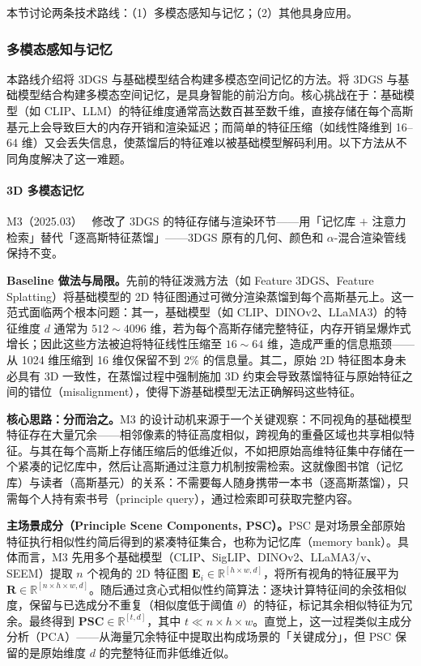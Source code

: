 本节讨论两条技术路线：（1）多模态感知与记忆；（2）其他具身应用。

\subsubsection{多模态感知与记忆}

本路线介绍将 3DGS 与基础模型结合构建多模态空间记忆的方法。将 3DGS 与基础模型结合构建多模态空间记忆，是具身智能的前沿方向。核心挑战在于：基础模型（如 CLIP、LLM）的特征维度通常高达数百甚至数千维，直接存储在每个高斯基元上会导致巨大的内存开销和渲染延迟；而简单的特征压缩（如线性降维到 16--64 维）又会丢失信息，使蒸馏后的特征难以被基础模型解码利用。以下方法从不同角度解决了这一难题。

\paragraph{3D 多模态记忆}

M3（2025.03）~\cite{2503_16413} 修改了 3DGS 的特征存储与渲染环节——用「记忆库 $+$ 注意力检索」替代「逐高斯特征蒸馏」——3DGS 原有的几何、颜色和 $\alpha$-混合渲染管线保持不变。

\textbf{Baseline 做法与局限。}先前的特征泼溅方法（如 Feature 3DGS、Feature Splatting）将基础模型的 2D 特征图通过可微分渲染蒸馏到每个高斯基元上。这一范式面临两个根本问题：其一，基础模型（如 CLIP、DINOv2、LLaMA3）的特征维度 $d$ 通常为 $512 \sim 4096$ 维，若为每个高斯存储完整特征，内存开销呈爆炸式增长；因此这些方法被迫将特征线性压缩至 $16 \sim 64$ 维，造成严重的信息瓶颈——从 1024 维压缩到 16 维仅保留不到 $2\%$ 的信息量。其二，原始 2D 特征图本身未必具有 3D 一致性，在蒸馏过程中强制施加 3D 约束会导致蒸馏特征与原始特征之间的错位（misalignment），使得下游基础模型无法正确解码这些特征。

\textbf{核心思路：分而治之。}M3 的设计动机来源于一个关键观察：不同视角的基础模型特征存在大量冗余——相邻像素的特征高度相似，跨视角的重叠区域也共享相似特征。与其在每个高斯上存储压缩后的低维近似，不如把原始高维特征集中存储在一个紧凑的记忆库中，然后让高斯通过注意力机制按需检索。这就像图书馆（记忆库）与读者（高斯基元）的关系：不需要每人随身携带一本书（逐高斯蒸馏），只需每个人持有索书号（principle query），通过检索即可获取完整内容。

\textbf{主场景成分（Principle Scene Components, PSC）。}PSC 是对场景全部原始特征执行相似性约简后得到的紧凑特征集合，也称为记忆库（memory bank）。具体而言，M3 先用多个基础模型（CLIP、SigLIP、DINOv2、LLaMA3/v、SEEM）提取 $n$ 个视角的 2D 特征图 $\mathbf{E}_i \in \mathbb{R}^{[h \times w, d]}$，将所有视角的特征展平为 $\mathbf{R} \in \mathbb{R}^{[n \times h \times w, d]}$。随后通过贪心式相似性约简算法：逐块计算特征间的余弦相似度，保留与已选成分不重复（相似度低于阈值 $\theta$）的特征，标记其余相似特征为冗余。最终得到 $\mathbf{PSC} \in \mathbb{R}^{[t, d]}$，其中 $t \ll n \times h \times w$。直觉上，这一过程类似主成分分析（PCA）——从海量冗余特征中提取出构成场景的「关键成分」，但 PSC 保留的是原始维度 $d$ 的完整特征而非低维近似。

